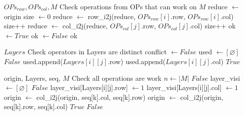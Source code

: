 \begin{algorithm}[htbp]
\caption{Verify\_Matrix}
\label{alg:verify-operations}
\begin{algorithmic}[1]
\Require $OPs_{row}, OPs_{col}, M$
\Ensure Check operations from OPs that can work on $M$
\State reduce $\leftarrow$ origin
\State size $\leftarrow 0$
	\State reduce $\leftarrow$ row\_i2j(reduce, $OPs_{row}[i]$.row, $OPs_{row}[i]$.col)
	\State size++
\EndFor 
{}
	\State reduce $\leftarrow$ col\_i2j(reduce, $OPs_{col}[j]$.row, $OPs_{col}[j]$.col)
	\State size++
\EndFor
\State ok $\leftarrow True$
	\State ok $\leftarrow False$
\EndIf 
\State \Return ok
\end{algorithmic}
\end{algorithm}


\begin{algorithm}[htbp]
\caption{Conflict\_Check}
\label{alg:conflict-check}
\begin{algorithmic}[1]
\Require $Layers$
\Ensure Check operators in Layers are distinct
\State conflict $\leftarrow False$
	\State used $\leftarrow [\varnothing]$
			\State \Return $False$
		\EndIf
		\State used.append($Layers[i][j]$.row)
		\State used.append($Layers[i][j]$.col)
	\EndFor
\EndFor
\State \Return $True$
\end{algorithmic}
\end{algorithm}

\begin{algorithm}[htbp]
\caption{Verify\_All}
\label{alg:verify-all}
\begin{algorithmic}[1]
\Require origin, Layers, seq, $M$
\Ensure Check all operations are work
\State $n \leftarrow |M|$
	\State \Return $False$
\EndIf
{}
	\State layer\_visi $\leftarrow [\varnothing]$
			\State \Return $False$
		\Else
			\State layer\_visi[Layers[i][j].row] $\leftarrow 1$
			\State layer\_visi[Layers[i][j].col] $\leftarrow 1$
		\EndIf
	\EndFor
\EndFor
{}
		\State origin $\leftarrow$ col\_i2j(origin, seq[k].col, seq[k].row)
	\Else
		\State origin $\leftarrow$ col\_i2j(origin, seq[k].row, seq[k].col)
	\EndIf
\EndFor
{}
	\State \Return $True$
\Else
	\State \Return $False$
\EndIf
\end{algorithmic}
\end{algorithm}

